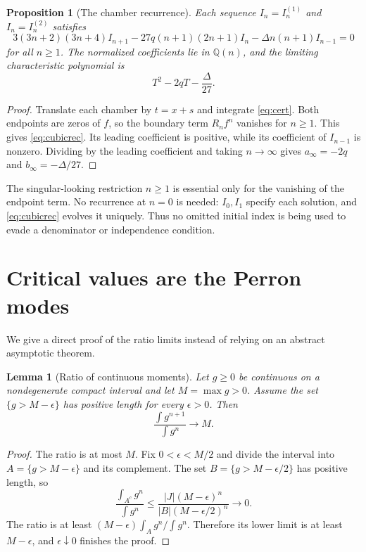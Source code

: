 \documentclass[11pt,a4paper]{article}
\newtheorem{lemma}[theorem]{Lemma}
\newtheorem{proposition}[theorem]{Proposition}
\theoremstyle{definition}\newtheorem{definition}[theorem]{Definition}
\theoremstyle{remark}\newtheorem{remark}[theorem]{Remark}
\newcommand{\Q}{\mathbb Q}\newcommand{\Z}{\mathbb Z}\newcommand{\N}{\mathbb N}\newcommand{\R}{\mathbb R}\newcommand{\C}{\mathbb C}
\begin{document}
\begin{proposition}[The chamber recurrence]\label{prop:recurrence}
Each sequence $I_n=I_n^{(1)}$ and $I_n=I_n^{(2)}$ satisfies
\begin{equation}\label{eq:cubicrec}
 3(3n+2)(3n+4)I_{n+1}
 -27q(n+1)(2n+1)I_n
 -\Delta n(n+1)I_{n-1}=0
\end{equation}
for all $n\ge1$. The normalized coefficients lie in $\Q(n)$, and the limiting characteristic polynomial is
\begin{equation}\label{eq:characteristic}
 T^2-2qT-\frac{\Delta}{27}.
\end{equation}
\end{proposition}
\begin{proof}
Translate each chamber by $t=x+s$ and integrate \eqref{eq:cert}. Both endpoints are zeros of $f$, so the boundary term $R_nf^n$ vanishes for $n\ge1$. This gives \eqref{eq:cubicrec}. Its leading coefficient is positive, while its coefficient of $I_{n-1}$ is nonzero. Dividing by the leading coefficient and taking $n\to\infty$ gives $a_\infty=-2q$ and $b_\infty=-\Delta/27$.
\end{proof}

The singular-looking restriction $n\ge1$ is essential only for the vanishing of the endpoint term. No recurrence at $n=0$ is needed: $I_0,I_1$ specify each solution, and \eqref{eq:cubicrec} evolves it uniquely. Thus no omitted initial index is being used to evade a denominator or independence condition.

\section{Critical values are the Perron modes}\label{sec:critical}
We give a direct proof of the ratio limits instead of relying on an abstract asymptotic theorem.

\begin{lemma}[Ratio of continuous moments]\label{lem:ratio}
Let $g\ge0$ be continuous on a nondegenerate compact interval and let $M=\max g>0$. Assume the set $\{g>M-\epsilon\}$ has positive length for every $\epsilon>0$. Then
\[
 \frac{\int g^{n+1}}{\int g^n}\longrightarrow M.
\]
\end{lemma}
\begin{proof}
The ratio is at most $M$. Fix $0<\epsilon<M/2$ and divide the interval into $A=\{g>M-\epsilon\}$ and its complement. The set $B=\{g>M-\epsilon/2\}$ has positive length, so
\[
 \frac{\int_{A^c}g^n}{\int g^n}
 \le\frac{|J|(M-\epsilon)^n}{|B|(M-\epsilon/2)^n}\longrightarrow0.
\]
The ratio is at least $(M-\epsilon)\int_Ag^n/\int g^n$. Therefore its lower limit is at least $M-\epsilon$, and $\epsilon\downarrow0$ finishes the proof.
\end{proof}
\end{document}
